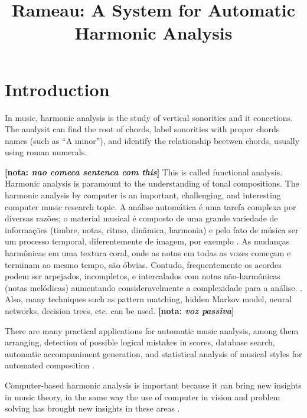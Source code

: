 \documentclass{article}
\title{Rameau: A System for Automatic Harmonic Analysis}
\newcommand{\nota}[1]{
  \textbf{[nota: \textit{#1}]}
}
\begin{document}
\maketitle

\begin{abstract}

\end{abstract}

\section{Introduction}
\label{sec:introduction}


In music, harmonic analysis is the study of vertical sonorities and it
conections. The analysit can find the root of chords, label sonorities
with proper chords names (such as ``A minor''), and identify the
relationship beetwen chords, usually using roman numerals.
\nota{nao comeca sentenca com this} This is called functional
analysis. Harmonic analysis is paramount to the understanding of tonal
compositions. The harmonic analysis by computer is an important,
challenging, and interesting computer music research topic. A análise
automática é uma tarefa complexa por diversas razões; o material
musical é composto de uma grande variedade de informações (timbre,
notas, ritmo, dinâmica, harmonia) e pelo fato de música ser um
processo temporal, diferentemente de imagem, por exemplo
\cite{mouton95:numeric}. As mudanças harmônicas em uma textura coral,
onde as notas em todas as vozes começam e terminam ao mesmo tempo, são
óbvias. Contudo, frequentemente os acordes podem ser arpejados,
incompletos, e intercalados com notas não-harmônicas (notas melódicas)
aumentando consideravelmente a complexidade para a análise.
\cite{pardo00:automated}. Also, many techniques such as pattern
matching, hidden Markov model, neural networks, decision trees, etc.
can be used. \nota{voz passiva}

There are many practical applications for automatic music analysis,
among them arranging, detection of possible logical mistakes in scores,
database search, automatic accompaniment generation, and statistical
analysis of musical styles for automated composition
\cite{pardo02:algorithms,temperley99:modeling}.

Computer-based harmonic analysis is important because it can bring new
insights in music theory, in the same way the use of computer in
vision and problem solving has brought new insights in these areas
\cite{temperley99:modeling}.
\end{document}
